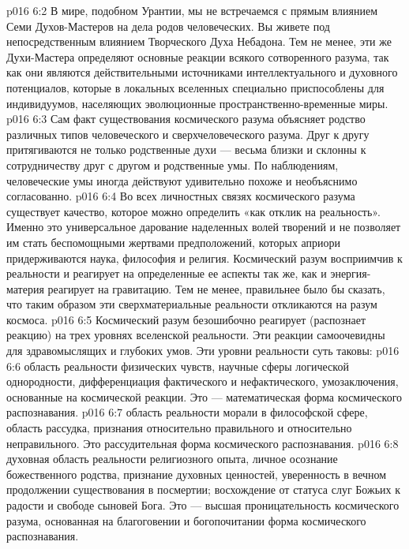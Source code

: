 \vs p016 6:2 В мире, подобном Урантии, мы не встречаемся с прямым влиянием Семи Духов\hyp{}Мастеров на дела родов человеческих. Вы живете под непосредственным влиянием Творческого Духа Небадона. Тем не менее, эти же Духи\hyp{}Мастера определяют основные реакции всякого сотворенного разума, так как они являются действительными источниками интеллектуального и духовного потенциалов, которые в локальных вселенных специально приспособлены для индивидуумов, населяющих эволюционные пространственно\hyp{}временные миры.
\vs p016 6:3 Сам факт существования космического разума объясняет родство различных типов человеческого и сверхчеловеческого разума. Друг к другу притягиваются не только родственные духи --- весьма близки и склонны к сотрудничеству друг с другом и родственные умы. По наблюдениям, человеческие умы иногда действуют удивительно похоже и необъяснимо согласованно.
\vs p016 6:4 \pc Во всех личностных связях космического разума существует качество, которое можно определить «как отклик на реальность». Именно это универсальное дарование наделенных волей творений и не позволяет им стать беспомощными жертвами предположений, которых априори придерживаются наука, философия и религия. Космический разум восприимчив к реальности и реагирует на определенные ее аспекты так же, как и энергия\hyp{}материя реагирует на гравитацию. Тем не менее, правильнее было бы сказать, что таким образом эти сверхматериальные реальности откликаются на разум космоса.
\vs p016 6:5 Космический разум безошибочно реагирует (распознает реакцию) на трех уровнях вселенской реальности. Эти реакции самоочевидны для здравомыслящих и глубоких умов. Эти уровни реальности суть таковы:
\vs p016 6:6 \bibnobreakspace {} область реальности физических чувств, научные сферы логической однородности, дифференциация фактического и нефактического, умозаключения, основанные на космической реакции. Это --- математическая форма космического распознавания.
\vs p016 6:7 \pc {}\bibnobreakspace {} область реальности морали в философской сфере, область рассудка, признания относительно правильного и относительно неправильного. Это рассудительная форма космического распознавания.
\vs p016 6:8 \pc {}\bibnobreakspace {} духовная область реальности религиозного опыта, личное осознание божественного родства, признание духовных ценностей, уверенность в вечном продолжении существования в посмертии; восхождение от статуса слуг Божьих к радости и свободе сыновей Бога. Это --- высшая проницательность космического разума, основанная на благоговении и богопочитании форма космического распознавания.
